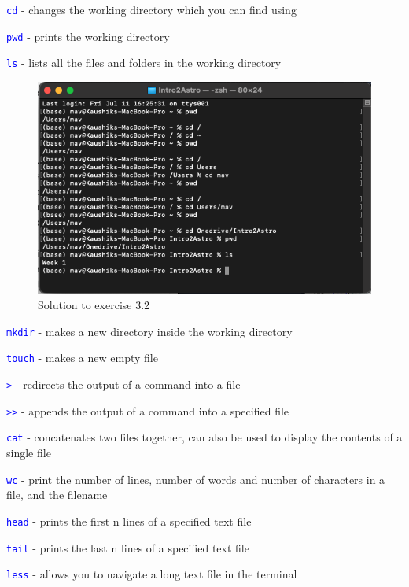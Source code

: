 \documentclass[floatfix, aps]{revtex4-2}
\begin{document}
\textcolor{blue}{\texttt{cd}} \tab - \tab changes the working directory which you can find using

\textcolor{blue}{\texttt{pwd}} \tab - \tab prints the working directory

\textcolor{blue}{\texttt{ls}} \tab - \tab lists all the files and folders in the working directory

\begin{figure}[H]
    \centering
    \includegraphics[width=0.75\linewidth]{Exercise 3.2.2 Unix Workbench.png}
    \caption{Solution to exercise 3.2}
    \label{fig:enter-label}
\end{figure}

\textcolor{blue}{\texttt{mkdir}} \tab - \tab makes a new directory inside the working directory

\textcolor{blue}{\texttt{touch}} \tab - \tab makes a new empty file

\textcolor{blue}{\texttt{>}} \tab - \tab redirects the output of a command into a file

\textcolor{blue}{\texttt{>>}} \tab - \tab appends the output of a command into a specified file

\textcolor{blue}{\texttt{cat}} \tab - \tab concatenates two files together, can also be used to display the contents of a single file 

\textcolor{blue}{\texttt{wc}} \tab - \tab print the number of lines, number of words and number of characters in a file, and the filename

\textcolor{blue}{\texttt{head}} \tab - \tab prints the first n lines of a specified text file

\textcolor{blue}{\texttt{tail}} \tab - \tab prints the last n lines of a specified text file

\textcolor{blue}{\texttt{less}} \tab - \tab allows you to navigate a long text file in the terminal
\end{document}
